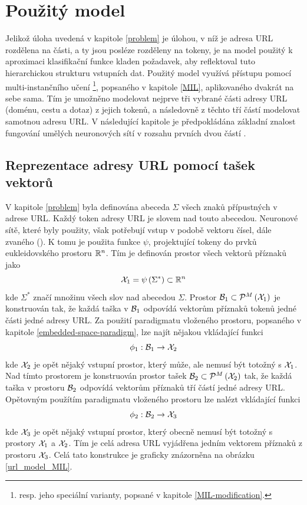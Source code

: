 \chapter{Použitý model}\label{model}

Jelikož úloha uvedená v kapitole \ref{problem} je úlohou, v níž je adresa URL rozdělena na části, a ty jsou posléze rozděleny na tokeny, je na model použitý k aproximaci klasifikační funkce kladen požadavek, aby reflektoval tuto hierarchickou strukturu vstupních dat. Použitý model využívá přístupu pomocí multi-instančního učení \footnote{resp. jeho speciální varianty, popsané v kapitole \ref{MIL-modification}.}, popsaného v kapitole \ref{MIL}, aplikovaného dvakrát na sebe sama. Tím je umožněno modelovat nejprve tři vybrané části adresy URL (doménu, cestu a dotaz) z jejich tokenů, a následovně z těchto tří částí modelovat samotnou adresu URL. V následující kapitole je předpokládána základní znalost fungování umělých neuronových sítí v rozsahu prvních dvou částí \cite{goodfellow_deep_2016}.

\section{Reprezentace adresy URL pomocí tašek vektorů}\label{URL_MIL_representation}
V kapitole \ref{problem} byla definována abeceda \( \Sigma \) všech znaků přípustných v adrese URL. Každý token adresy URL je slovem nad touto abecedou. Neuronové sítě, které byly použity, však potřebují vstup v podobě vektoru čísel, dále zvaného  (). K tomu je použita funkce \( \psi \), projektující tokeny do prvků eukleidovského prostoru \( \mathbb R^n \). Tím je definován prostor všech vektorů příznaků jako
\[ \mathcal X_1 = \psi \left( \Sigma^* \right) \subset \mathbb R^n \]
kde \( \Sigma^* \) značí množinu všech slov nad abecedou \( \Sigma \). Prostor \( \mathcal B_1 \subset \mathcal P^M \left( \mathcal X_1 \right) \) je konstruován tak, že každá taška v \( \mathcal B_1 \) odpovídá vektorům příznaků tokenů jedné části jedné adresy URL. Za použití paradigmatu vloženého prostoru, popsaného v kapitole \ref{embedded-space-paradigm}, lze najít nějakou vkládající funkci
\[ \phi_1 : \mathcal B_1 \to \mathcal X_2 \]
kde \( \mathcal X_2 \) je opět nějaký vstupní prostor, který může, ale nemusí být totožný s \( \mathcal X_1 \). Nad tímto prostorem je konstruován prostor tašek \( \mathcal B_2 \subset \mathcal P^M \left( \mathcal X_2 \right) \) tak, že každá taška v prostoru \( \mathcal B_2 \) odpovídá vektorům příznaků tří částí jedné adresy URL. Opětovným použítím paradigmatu vloženého prostoru lze nalézt vkládající funkci
\[ \phi_2 : \mathcal B_2 \to \mathcal X_3 \]
kde \( \mathcal X_3 \) je opět nějaký vstupní prostor, který obecně nemusí být totožný s prostory \( \mathcal X_1 \) a \( \mathcal X_2 \). Tím je celá adresa URL vyjádřena jedním vektorem příznaků z prostoru \( \mathcal X_3 \). Celá tato konstrukce je graficky znázorněna na obrázku \ref{url_model_MIL}.

